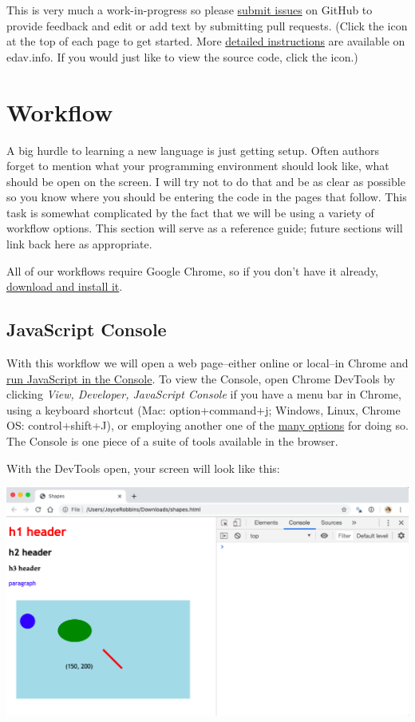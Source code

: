 \documentclass[
  openany]{book}
\begin{document}
This is very much a work-in-progress so please \href{https://github.com/jtr13/d3book/issues}{submit issues} on GitHub to provide feedback and edit or add text by submitting pull requests. (Click the icon at the top of each page to get started. More \href{https://edav.info/contribute.html\#step-2-click-the-edit-button}{detailed instructions} are available on edav.info. If you would just like to view the source code, click the icon.)

\hypertarget{workflow}{%
\section{Workflow}\label{workflow}}

A big hurdle to learning a new language is just getting setup. Often authors forget to mention what your programming environment should look like, what should be open on the screen. I will try not to do that and be as clear as possible so you know where you should be entering the code in the pages that follow. This task is somewhat complicated by the fact that we will be using a variety of workflow options. This section will serve as a reference guide; future sections will link back here as appropriate.

All of our workflows require Google Chrome, so if you don't have it already, \href{https://www.google.com/chrome/}{download and install it}.

\hypertarget{javascript-console}{%
\subsection{JavaScript Console}\label{javascript-console}}

With this workflow we will open a web page--either online or local--in Chrome and \href{https://developers.google.com/web/tools/chrome-devtools/console/javascript}{run JavaScript in the Console}. To view the Console, open Chrome DevTools by clicking \emph{View, Developer, JavaScript Console} if you have a menu bar in Chrome, using a keyboard shortcut (Mac: option+command+j; Windows, Linux, Chrome OS: control+shift+J), or employing another one of the \href{https://developers.google.com/web/tools/chrome-devtools/open}{many options} for doing so. The Console is one piece of a suite of tools available in the browser.

With the DevTools open, your screen will look like this:

\includegraphics[width=1\linewidth]{images/console}
\end{document}
